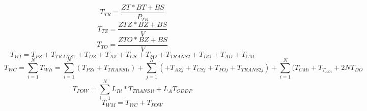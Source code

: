 	\begin{equation}
		\label{eq:czasTrz}
		T_{TR} = \frac{ZT*BT + BS}{P_{TR}}
	\end{equation}
	\begin{equation}
		\label{eq:czasTz}
		T_{TZ} = \frac{ZTZ*BZ + BS}{V}
	\end{equation}
	\begin{equation}
		\label{eq:czasTo}
		T_{TO} = \frac{ZTO*BZ+BS}{V}
	\end{equation}
	\begin{equation}
		\label{eq:czasPW}
		T_{WI} = T_{PZ}+T_{TRANS1} + T_{DZ} + T_{AZ} + T_{CS} + T_{PO} + T_{TRANS2} + T_{DO} + T_{AD} + T_{CM}
	\end{equation}
	\begin{equation}
		\label{eq:czasWW}
		T_{WC} = \sum\limits_{i=1}^N T_{WIi} = \sum\limits_{i=1}^N (T_{PZi} + T_{TRANS1i}) + \sum\limits_{j=1}^N ( + T_{AZj} + T_{CSj} + T_{POj} + T_{TRANS2j}) + \sum\limits_{i=1}^N (T_{CMi}+T_{T_{AOi}} + 2NT_{DO}
	\end{equation}
	\begin{equation}
		\label{eq:czasPO}
		T_{POW} = \sum\limits_{i=1}^N L_{Ri}*T_{TRANS1i} + L_{A}T_{ODDP}
	\end{equation}
	\begin{equation}
		\label{eq:czasMAX}
		T_{WM} = T_{WC} + T_{POW}
	\end{equation}